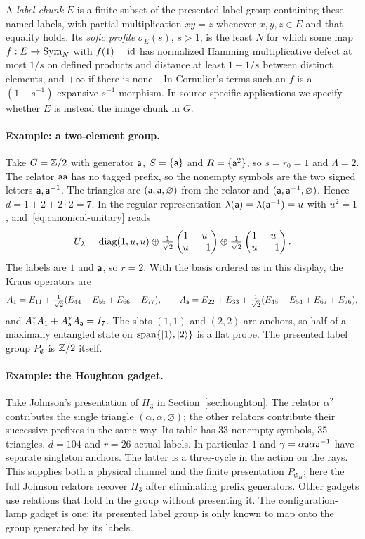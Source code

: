 A \emph{label chunk} $E$ is a finite subset of the presented label
group containing these named labels, with partial multiplication
$xy=z$ whenever $x,y,z\in E$ and that equality holds. Its
\emph{sofic profile} $\sigma_E(s)$, $s>1$, is the least $N$ for
which some map $f:E\to\operatorname{Sym}_N$ with $f(1)=\mathrm{id}$ has normalized Hamming
multiplicative defect at most $1/s$ on defined products and
distance at least $1-1/s$ between distinct elements, and $+\infty$ if
there is none~\cite[Definitions~3.2 and~3.4]{Cornulier2013}. In
Cornulier's terms such an $f$ is a $(1-s^{-1})$-expansive
$s^{-1}$-morphism. In source-specific applications
we specify whether $E$ is instead the image chunk in $G$.

\paragraph{Example: a two-element group.}
Take $G=\mathbb Z/2$ with generator $\mathsf a$, $S=\{\mathsf a\}$ and $R=\{\mathsf a^2\}$,
so $s=r_0=1$ and $\Lambda=2$. The relator $\mathsf a\mathsf a$ has no tagged
prefix, so the nonempty symbols are the two signed letters
$\mathsf a,\mathsf a^{-1}$. The triangles are $(\mathsf a,\mathsf a,\varnothing)$ from the
relator and $(\mathsf a,\mathsf a^{-1},\varnothing)$. Hence $d=1+2+2\cdot2=7$.
In the regular representation $\lambda(\mathsf a)=\lambda(\mathsf a^{-1})=u$
with $u^2=1$, and~\eqref{eq:canonical-unitary} reads
\[
 U_\lambda=\operatorname{diag}(1,u,u)\oplus\tfrac1{\sqrt2}\begin{pmatrix}1&u\\u&-1\end{pmatrix}
 \oplus\tfrac1{\sqrt2}\begin{pmatrix}1&u\\u&-1\end{pmatrix}.
\]
The labels are $1$ and $\mathsf a$, so $r=2$. With the basis ordered as in
this display, the Kraus operators are
\[
 A_1=E_{11}+\tfrac1{\sqrt2}(E_{44}-E_{55}+E_{66}-E_{77}),\qquad
 A_{\mathsf a}=E_{22}+E_{33}+\tfrac1{\sqrt2}(E_{45}+E_{54}+E_{67}+E_{76}),
\]
and $A_1^*A_1+A_{\mathsf a}^*A_{\mathsf a}=I_7$. The slots $(1,1)$ and $(2,2)$ are
anchors, so half of a maximally entangled state on
$\operatorname{span}\{\lvert 1\rangle,\lvert 2\rangle\}$ is a flat probe. The presented label group
$P_\Phi$ is $\mathbb Z/2$ itself.

\paragraph{Example: the Houghton gadget.}
Take Johnson's presentation of $H_3$ in Section~\ref{sec:houghton}.
The relator $\alpha^2$ contributes the single triangle
$(\alpha,\alpha,\varnothing)$; the other relators contribute their
successive prefixes in the same way. Its table has 33 nonempty symbols, 35 triangles, $d=104$ and
$r=26$ actual labels. In particular $1$ and
$\gamma=\alpha\mathsf a\alpha\mathsf a^{-1}$ have separate singleton anchors.
The latter is a three-cycle in the action on the rays.
This supplies both a physical channel and the finite presentation
$P_{\Phi_H}$; here the full Johnson relators recover $H_3$ after
eliminating prefix generators. Other gadgets use relations that
hold in the group without presenting it. The configuration-lamp
gadget is one: its presented label group is only known to map onto
the group generated by its labels.

